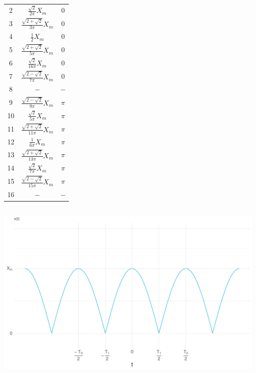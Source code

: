 \documentclass[a4paper, 12pt]{article}
\begin{document}
\begin{center}
\begin{tabular}{@{}ccc@{}}
        2          &  $\frac{\sqrt{2}}{2\pi}X_m$         &       $0$        \\
        3          &  $\frac{\sqrt{2 + \sqrt{2}}}{3\pi}X_m$         &   $0$           \\
        4          &  $\frac{1}{2}X_m$         &       $0$        \\
        5          &  $\frac{\sqrt{2 + \sqrt{2}}}{5\pi}X_m$      &       $0$      \\
        6          &  $\frac{\sqrt{2}}{16\pi}X_m$         &       $0$      \\
        7          &  $\frac{\sqrt{2 - \sqrt{2}}}{7\pi}X_m$         &          $0$   \\
        8          &  $-$         &       $-$       \\
        9          &  $\frac{\sqrt{2 - \sqrt{2}}}{9\pi}X_m$         &       $\pi$      \\
        10         &  $\frac{\sqrt{2}}{5\pi}X_m$         &       $\pi$       \\
        11         &  $\frac{\sqrt{2 + \sqrt{2}}}{11\pi}X_m$         &       $\pi$      \\
        12         &  $\frac{1}{6\pi}X_m$         &       $\pi$       \\
        13         &  $\frac{\sqrt{2 + \sqrt{2}}}{13\pi}X_m$         &      $\pi$       \\
        14         &  $\frac{\sqrt{2}}{7\pi}X_m$         &      $\pi$        \\
        15         &  $\frac{\sqrt{2 - \sqrt{2}}}{15\pi}X_m$         &      $\pi$       \\
        16         &  $-$         &       $-$       \\ \bottomrule
        \end{tabular}
        \egroup
      \end{center}

  \subsection{}
    \begin{center}
      \includegraphics[scale=0.5]{./R/2_2/2_2_function.pdf}
    \end{center}
\end{document}
